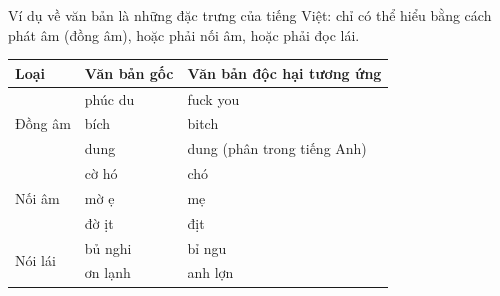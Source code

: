 Ví dụ về văn bản là những đặc trưng của tiếng Việt: chỉ có thể hiểu bằng cách phát âm (đồng âm), hoặc phải nối âm, hoặc phải đọc lái.
\begin{table}[htb]
    \centering
    \begin{tabular}{lll}
        \toprule
        \textbf{Loại}            & \textbf{Văn bản gốc} & \textbf{Văn bản độc hại tương ứng} \\\midrule
        \multirow{3}{*}{Đồng âm} & phúc du              & fuck you                           \\
                                 & bích                 & bitch                              \\
                                 & dung                 & dung (phân trong tiếng Anh)        \\\midrule
        \multirow{3}{*}{Nối âm}  & cờ hó                & chó                                \\
                                 & mờ ẹ                 & mẹ                                 \\
                                 & đờ ịt                & địt                                \\\midrule
        \multirow{2}{*}{Nói lái} & bủ nghi              & bỉ ngu                             \\
                                 & ơn lạnh              & anh lợn                            \\
        \bottomrule
    \end{tabular}
\end{table}

\newpage
